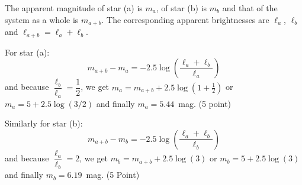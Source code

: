 The apparent magnitude of star (a) is $m_a$, of star (b) is $m_b$ and that of
the system as a whole is $m_{a+b}$. The corresponding apparent brightnesses are
$\ell_a$, $\ell_b$ and $\ell_{a+b} = \ell_a + \ell_b$.

For star (a):
\[
m_{a+b} - m_a = -2.5 \log\!\left(\frac{\ell_a + \ell_b}{\ell_a}\right)
\]
and because $\dfrac{\ell_b}{\ell_a} = \dfrac{1}{2}$, we get
$m_a = m_{a+b} + 2.5 \log\left(1 + \tfrac{1}{2}\right)$ or
$m_a = 5 + 2.5 \log (3/2)$ and finally $m_a = 5.44$~mag. \hfill(5 point)

Similarly for star (b):
\[
m_{a+b} - m_b = -2.5 \log\!\left(\frac{\ell_a + \ell_b}{\ell_b}\right)
\]
and because $\dfrac{\ell_a}{\ell_b} = 2$, we get
$m_b = m_{a+b} + 2.5 \log (3)$ or
$m_b = 5 + 2.5 \log (3)$ and finally $m_b = 6.19$~mag. \hfill(5 Point)


